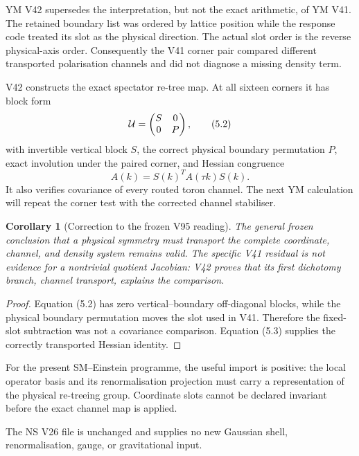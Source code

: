 \documentclass[11pt]{article}
\newtheorem{corollary}[theorem]{Corollary}
\theoremstyle{remark}
\begin{document}
YM V42 supersedes the interpretation, but not the exact arithmetic,
of YM V41.  The retained boundary list was ordered by lattice
position while the response code treated its slot as the physical
direction.  The actual slot order is the reverse physical-axis order.
Consequently the V41 corner pair compared different transported
polarisation channels and did not diagnose a missing density term.

V42 constructs the exact spectator re-tree map.  At all sixteen
corners it has block form
\[
                              {\cal U}=
 \begin{pmatrix}S&0\\0&P\end{pmatrix},                       \tag{5.2}
\]
with invertible vertical block \(S\), the correct physical boundary
permutation \(P\), exact involution under the paired corner, and
Hessian congruence
\[
                              A(k)=S(k)^TA(\tau k)S(k).       \tag{5.3}
\]
It also verifies covariance of every routed toron channel.  The next
YM calculation will repeat the corner test with the corrected channel
stabiliser.

\begin{corollary}[Correction to the frozen V95 reading]
\label{cor:v12v5-correction}
The general frozen conclusion that a physical symmetry must transport
the complete coordinate, channel, and density system remains valid.
The specific V41 residual is not evidence for a nontrivial quotient
Jacobian: V42 proves that its first dichotomy branch, channel
transport, explains the comparison.
\end{corollary}

\begin{proof}
Equation (5.2) has zero vertical--boundary off-diagonal blocks, while
the physical boundary permutation moves the slot used in V41.
Therefore the fixed-slot subtraction was not a covariance comparison.
Equation (5.3) supplies the correctly transported Hessian identity.
\end{proof}

For the present SM--Einstein programme, the useful import is positive:
the local operator basis and its renormalisation projection must carry
a representation of the physical re-treeing group.  Coordinate slots
cannot be declared invariant before the exact channel map is applied.

The NS V26 file is unchanged and supplies no new Gaussian shell,
renormalisation, gauge, or gravitational input.
\end{document}
